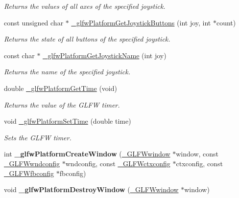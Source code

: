\begin{DoxyCompactItemize}
\begin{DoxyCompactList}\small\item\em Returns the values of all axes of the specified joystick. \end{DoxyCompactList}\item 
const unsigned char $\ast$ \hyperlink{group__platform_gafc09b5bd02e6f98873117ca6f86d0fe6}{\+\_\+glfw\+Platform\+Get\+Joystick\+Buttons} (int joy, int $\ast$count)
\begin{DoxyCompactList}\small\item\em Returns the state of all buttons of the specified joystick. \end{DoxyCompactList}\item 
const char $\ast$ \hyperlink{group__platform_ga2e41c4ab4eeb7e437bbb9dce58b16f27}{\+\_\+glfw\+Platform\+Get\+Joystick\+Name} (int joy)
\begin{DoxyCompactList}\small\item\em Returns the name of the specified joystick. \end{DoxyCompactList}\item 
double \hyperlink{group__platform_ga42528913973ea604994212d17d80a67b}{\+\_\+glfw\+Platform\+Get\+Time} (void)
\begin{DoxyCompactList}\small\item\em Returns the value of the G\+L\+F\+W timer. \end{DoxyCompactList}\item 
void \hyperlink{group__platform_ga3ec7765724b69e6e75a855e2363c298c}{\+\_\+glfw\+Platform\+Set\+Time} (double time)
\begin{DoxyCompactList}\small\item\em Sets the G\+L\+F\+W timer. \end{DoxyCompactList}\item 
\hypertarget{group__platform_gad7f9fd053009c1add7335c8ef4f94d4f}{}int {\bfseries \+\_\+glfw\+Platform\+Create\+Window} (\hyperlink{struct__GLFWwindow}{\+\_\+\+G\+L\+F\+Wwindow} $\ast$window, const \hyperlink{struct__GLFWwndconfig}{\+\_\+\+G\+L\+F\+Wwndconfig} $\ast$wndconfig, const \hyperlink{struct__GLFWctxconfig}{\+\_\+\+G\+L\+F\+Wctxconfig} $\ast$ctxconfig, const \hyperlink{struct__GLFWfbconfig}{\+\_\+\+G\+L\+F\+Wfbconfig} $\ast$fbconfig)\label{group__platform_gad7f9fd053009c1add7335c8ef4f94d4f}

\item 
\hypertarget{group__platform_ga89f7ad4aa22c7f523ab39db732314119}{}void {\bfseries \+\_\+glfw\+Platform\+Destroy\+Window} (\hyperlink{struct__GLFWwindow}{\+\_\+\+G\+L\+F\+Wwindow} $\ast$window)\label{group__platform_ga89f7ad4aa22c7f523ab39db732314119}


\end{DoxyCompactItemize}
